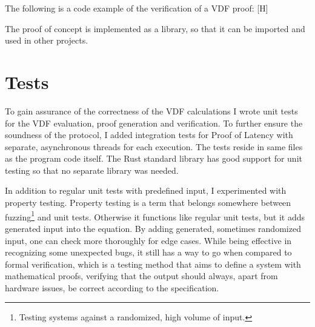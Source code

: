 The following is a code example of the verification of a VDF proof:
[H]

The proof of concept is implemented as a library, so that it can be imported and used in other projects.

\section{Tests}
To gain assurance of the correctness of the VDF calculations I wrote unit tests for the VDF evaluation, proof generation and verification. To further ensure the soundness of the protocol, I added integration tests for Proof of Latency with separate, asynchronous threads for each execution. The tests reside in same files as the program code itself. The Rust standard library has good support for unit testing so that no separate library was needed.

In addition to regular unit tests with predefined input, I experimented with property testing. Property testing is a term that belongs somewhere between fuzzing\footnote{Testing systems against a randomized, high volume of input.} and unit tests. Otherwise it functions like regular unit tests, but it adds generated input into the equation. By adding generated, sometimes randomized input, one can check more thoroughly for edge cases. While being effective in recognizing some unexpected bugs, it still has a way to go when compared to formal verification, which is a testing method that aims to define a system with mathematical proofs, verifying that the output should always, apart from hardware issues, be correct according to the specification.

